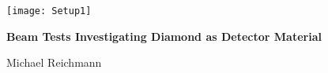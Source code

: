 \begin{frame}
	\begin{center}
		\texttt{[image: Setup1]}
	\end{center}
	\begin{alertblock}{
		\begin{center}
			\textbf{Beam Tests Investigating Diamond as Detector Material}
		\end{center}}
		\vspace*{10pt}
		\begin{center}\small
		Michael Reichmann
		\end{center}\normalsize
	\end{alertblock}
\end{frame}
\usebackgroundtemplate{}
